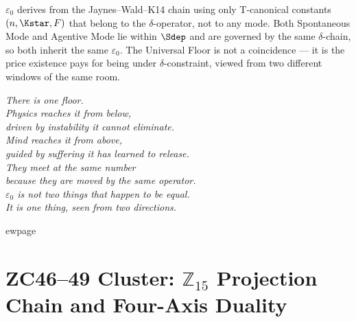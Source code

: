 \documentclass[12pt, a4paper]{article}
\begin{document}

\begin{keybox}[title={ZC45 in Three Sentences}]
$\varepsilon_0$ derives from the Jaynes--Wald--K14 chain
using only T-canonical constants $(n, \Kstar, F)$ that
belong to the $\delta$-operator, not to any mode.
Both Spontaneous Mode and Agentive Mode lie within $\Sdep$
and are governed by the same $\delta$-chain, so both
inherit the same $\varepsilon_0$.
The Universal Floor is not a coincidence --- it is the
price existence pays for being under $\delta$-constraint,
viewed from two different windows of the same room.
\end{keybox}

\bigskip
\begin{center}
\textit{There is one floor.\\[0.3em]
Physics reaches it from below,\\
driven by instability it cannot eliminate.\\[0.3em]
Mind reaches it from above,\\
guided by suffering it has learned to release.\\[0.3em]
They meet at the same number\\
because they are moved by the same operator.\\[0.3em]
$\varepsilon_0$ is not two things that happen to be equal.\\
It is one thing, seen from two directions.}
\end{center}


ewpage

\part{ZC46--49 Cluster: $\mathbb{Z}_{15}$ Projection Chain and
  Four-Axis Duality}
\label{part:xxxvi}
\end{document}
